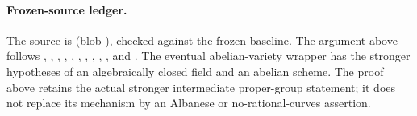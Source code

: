 \paragraph{Frozen-source ledger.}
The source is
\href{https://github.com/ChristianKudeba/alpoge-rh-verification/blob/alpoge-source-7cbf7a0c/src/Development/AbelianVarietyTheory/Proofs/DegenerationProofs/SplitTorusToAbelianVarietyConst.lean}
{}
(blob ),
checked against the frozen baseline.
The argument above follows
, ,
, ,
, ,
, ,
, , and
.
The eventual abelian-variety wrapper has the stronger hypotheses
of an algebraically closed field and an abelian scheme.
The proof above retains the actual stronger intermediate
proper-group statement; it does not replace its mechanism by
an Albanese or no-rational-curves assertion.
